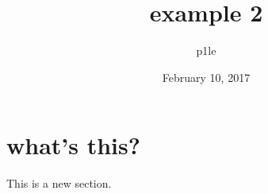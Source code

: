 \documentclass[a4paper, 11pt]{article}
\begin{document}
\title{example 2}
\author{p1le}
\date{February 10, 2017}
\maketitle
\section{what's this?}
This is a new section.
\end{document}
